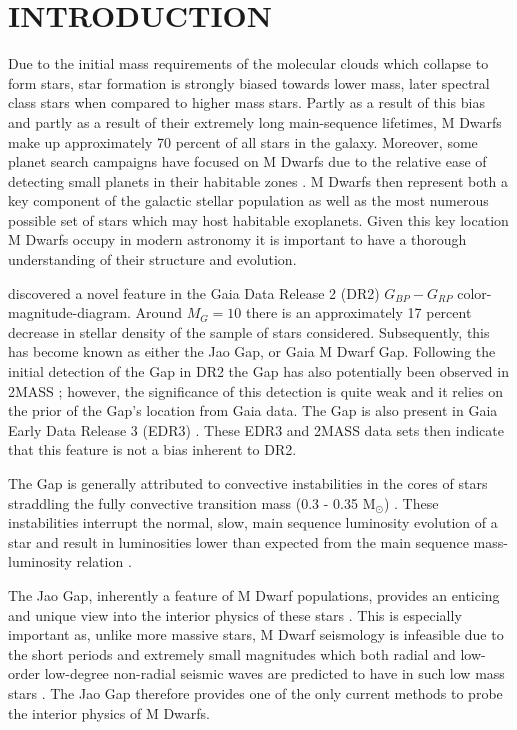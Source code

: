 \section{INTRODUCTION}\label{sec:intro}
Due to the initial mass requirements of the molecular clouds which collapse to form
stars, star formation is strongly biased towards lower mass, later spectral
class stars when compared to higher mass stars. Partly as a result of this
bias and partly as a result of their extremely long main-sequence lifetimes,
M Dwarfs make up approximately 70 percent of all stars in the galaxy. Moreover,
some planet search campaigns have focused on M Dwarfs due to the relative ease
of detecting small planets in their habitable zones \citep[e.g.][]{Nut08}.
M Dwarfs then represent both a key component of the galactic stellar population
as well as the most numerous possible set of stars which may host habitable exoplanets.
Given this key location M Dwarfs occupy in modern astronomy it is important to
have a thorough understanding of their structure and evolution.

\citet{Jao2018} discovered a novel feature in the Gaia Data Release 2 (DR2)
$G_{BP}-G_{RP}$ color-magnitude-diagram. Around $M_{G}=10$ there is an
approximately 17 percent decrease in stellar density of the sample of stars
\citet{Jao2018} considered. Subsequently, this has become known as either the
Jao Gap, or Gaia M Dwarf Gap. Following the initial detection of the Gap in DR2
the Gap has also potentially been observed in 2MASS \citep{Skrutskie2006,
Jao2018}; however, the significance of this detection is quite weak and it
relies on the prior of the Gap's location from Gaia data. The Gap is
also present in Gaia Early Data Release 3 (EDR3) \citep{Jao2021}. These EDR3
and 2MASS data sets then indicate that this feature is not a bias inherent to
DR2.

The Gap is generally attributed to convective instabilities in the cores of
stars straddling the fully convective transition mass (0.3 - 0.35 M$_{\odot}$)
\citep{Baraffe2018}. These instabilities interrupt the normal, slow, main
sequence luminosity evolution of a star and result in luminosities lower
than expected from the main sequence mass-luminosity relation \citep{Jao2020}.

The Jao Gap, inherently a feature of M Dwarf populations, provides an enticing
and unique view into the interior physics of these stars \citep{Feiden2021}.
This is especially important as, unlike more massive stars, M Dwarf seismology
is infeasible due to the short periods and extremely small
magnitudes which both radial and low-order low-degree non-radial seismic waves
are predicted to have in such low mass stars \citep{Rodriguez-Lopez2019}. The
Jao Gap therefore provides one of the only current methods to probe the
interior physics of M Dwarfs.


